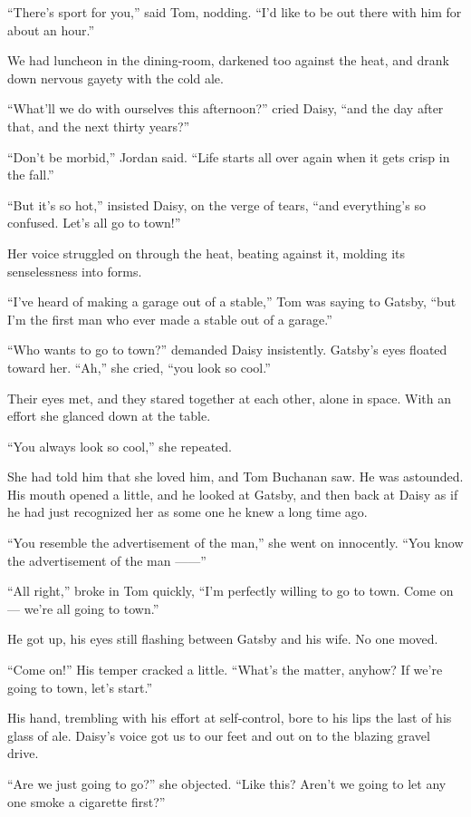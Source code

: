 \documentclass{znotebook}
\begin{document}
``There’s sport for you,'' said Tom, nodding. ``I’d like to be out there with him for about an hour.''

We had luncheon in the dining-room, darkened too against the heat, and drank down nervous gayety with the cold ale.

``What’ll we do with ourselves this afternoon?'' cried Daisy, ``and the day after that, and the next thirty years?''

``Don’t be morbid,'' Jordan said. ``Life starts all over again when it gets crisp in the fall.''

``But it’s so hot,'' insisted Daisy, on the verge of tears, ``and everything’s so confused. Let’s all go to town!''

Her voice struggled on through the heat, beating against it, molding its senselessness into forms.

``I’ve heard of making a garage out of a stable,'' Tom was saying to Gatsby, ``but I’m the first man who ever made a stable out of a garage.''

``Who wants to go to town?'' demanded Daisy insistently. Gatsby’s eyes floated toward her. ``Ah,'' she cried, ``you look so cool.''

Their eyes met, and they stared together at each other, alone in space. With an effort she glanced down at the table.

``You always look so cool,'' she repeated.

She had told him that she loved him, and Tom Buchanan saw. He was astounded. His mouth opened a little, and he looked at Gatsby, and then back at Daisy as if he had just recognized her as some one he knew a long time ago.

``You resemble the advertisement of the man,'' she went on innocently. ``You know the advertisement of the man ——''

``All right,'' broke in Tom quickly, ``I’m perfectly willing to go to town. Come on — we’re all going to town.''

He got up, his eyes still flashing between Gatsby and his wife. No one moved.

``Come on!'' His temper cracked a little. ``What’s the matter, anyhow? If we’re going to town, let’s start.''

His hand, trembling with his effort at self-control, bore to his lips the last of his glass of ale. Daisy’s voice got us to our feet and out on to the blazing gravel drive.

``Are we just going to go?'' she objected. ``Like this? Aren’t we going to let any one smoke a cigarette first?''
\end{document}

